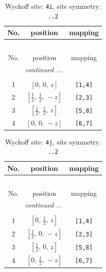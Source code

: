 \documentclass[fleqn,8pt]{jsarticle}
\begin{document}
\renewcommand{\arraystretch}{1.2}
\begin{longtable}{ccc}
\caption{Wyckoff site: {\tt 4i}, site symmetry: {\tt ..2}}
 \\
 \hline \hline
No. & position & mapping \\ \hline \endfirsthead

\multicolumn{2}{l}{\tablename\ \thetable{}} \\
 \hline \hline
No. & position & mapping \\ \hline \endhead

 \hline \hline
\multicolumn{2}{r}{\footnotesize\it continued ...} \\ \endfoot

 \hline \hline
\multicolumn{2}{r}{} \\ \endlastfoot

1 & $\left[ 0,\, 0,\, z \right]$ & {\tt [1,4]} \\ \hline
2 & $\left[ \frac{1}{2},\, \frac{1}{2},\, - z \right]$ & {\tt [2,3]} \\ \hline
3 & $\left[ \frac{1}{2},\, \frac{1}{2},\, z \right]$ & {\tt [5,8]} \\ \hline
4 & $\left[ 0,\, 0,\, - z \right]$ & {\tt [6,7]} \\
\end{longtable}
\renewcommand{\arraystretch}{1.2}
\begin{longtable}{ccc}
\caption{Wyckoff site: {\tt 4j}, site symmetry: {\tt ..2}}
 \\
 \hline \hline
No. & position & mapping \\ \hline \endfirsthead

\multicolumn{2}{l}{\tablename\ \thetable{}} \\
 \hline \hline
No. & position & mapping \\ \hline \endhead

 \hline \hline
\multicolumn{2}{r}{\footnotesize\it continued ...} \\ \endfoot

 \hline \hline
\multicolumn{2}{r}{} \\ \endlastfoot

1 & $\left[ 0,\, \frac{1}{2},\, z \right]$ & {\tt [1,4]} \\ \hline
2 & $\left[ \frac{1}{2},\, 0,\, - z \right]$ & {\tt [2,3]} \\ \hline
3 & $\left[ \frac{1}{2},\, 0,\, z \right]$ & {\tt [5,8]} \\ \hline
4 & $\left[ 0,\, \frac{1}{2},\, - z \right]$ & {\tt [6,7]} \\
\end{longtable}
\end{document}
